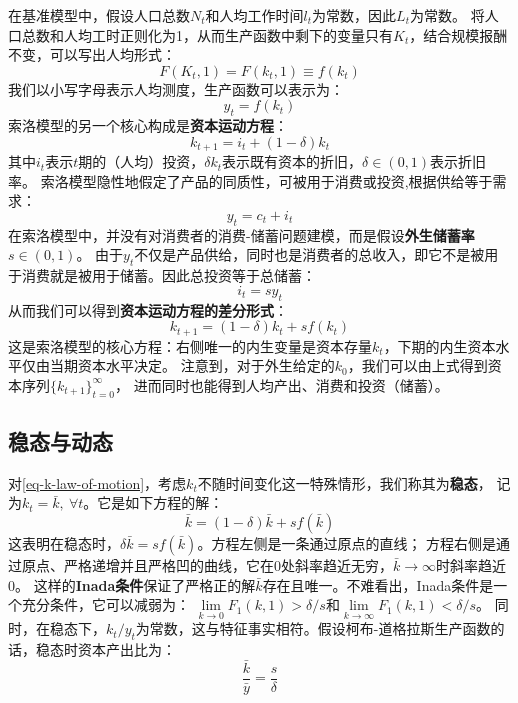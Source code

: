 在基准模型中，假设人口总数$N_t$和人均工作时间$l_t$为常数，因此$L_t$为常数。
将人口总数和人均工时正则化为1，从而生产函数中剩下的变量只有$K_t$，结合规模报酬不变，可以写出人均形式：
\begin{equation*}
    F(K_t, 1)=F(k_t, 1)\equiv f(k_t)
\end{equation*}
我们以小写字母表示人均测度，生产函数可以表示为：
\begin{equation}
    y_t = f(k_t)
\end{equation}
索洛模型的另一个核心构成是\textbf{资本运动方程}：
\begin{equation}    
    k_{t+1} = i_t + (1-\delta)k_t
\end{equation}
其中$i_t$表示$t$期的（人均）投资，$\delta k_t$表示既有资本的折旧，$\delta\in (0,1)$表示折旧率。
索洛模型隐性地假定了产品的同质性，可被用于消费或投资,根据供给等于需求：
\begin{equation}
    y_t = c_t + i_t
\end{equation}
在索洛模型中，并没有对消费者的消费-储蓄问题建模，而是假设\textbf{外生储蓄率}$s\in(0,1)$。
由于$y_t$不仅是产品供给，同时也是消费者的总收入，即它不是被用于消费就是被用于储蓄。因此总投资等于总储蓄：
\begin{equation}
    i_t = s y_t
\end{equation}
从而我们可以得到\textbf{资本运动方程的差分形式}：
\begin{equation}    \label{eq-k-law-of-motion}
    k_{t+1} = (1-\delta)k_t + sf(k_t)
\end{equation}
这是索洛模型的核心方程：右侧唯一的内生变量是资本存量$k_t$，下期的内生资本水平仅由当期资本水平决定。
注意到，对于外生给定的$k_0$，我们可以由上式得到资本序列$\{k_{t+1}\}_{t=0}^{\infty}$，
进而同时也能得到人均产出、消费和投资（储蓄）。


\subsection{稳态与动态}

对\cref{eq-k-law-of-motion}，考虑$k_t$不随时间变化这一特殊情形，我们称其为\textbf{稳态}，
记为$k_t=\bar{k},~\forall t$。它是如下方程的解：
\begin{equation*}
    \bar{k}=(1-\delta) \bar{k}+s f(\bar{k})
\end{equation*}
这表明在稳态时，$\delta \bar{k} = sf(\bar{k})$。方程左侧是一条通过原点的直线；
方程右侧是通过原点、严格递增并且严格凹的曲线，它在0处斜率趋近无穷，$\bar{k}\rightarrow \infty$时斜率趋近0。
这样的\textbf{Inada条件}保证了严格正的解$\bar{k}$存在且唯一。不难看出，Inada条件是一个充分条件，它可以减弱为：
$\lim\limits_{k\rightarrow 0}F_1(k,1)>\delta/s$和$\lim\limits_{k\rightarrow \infty}F_1(k,1)<\delta/s$。
同时，在稳态下，$k_t/y_t$为常数，这与特征事实相符。假设柯布-道格拉斯生产函数的话，稳态时资本产出比为：
\begin{equation*}
    \frac{\bar{k}}{\bar{y}} = \frac{s}{\delta}
\end{equation*}

